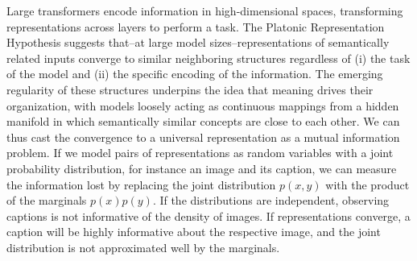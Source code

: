 \documentclass[10pt]{article} %
\begin{document}






Large transformers encode information in high-dimensional spaces,
transforming representations across layers to perform a task. The
Platonic Representation Hypothesis \citep{platonic_hypothesis}
suggests that--at large model sizes--representations of semantically related inputs converge to
similar neighboring structures regardless of (i) the task of the
model and (ii) the specific encoding of the information. The emerging
regularity of these structures underpins the idea that meaning drives
their organization, with models loosely acting as continuous mappings
from a hidden manifold in which semantically similar concepts are close
to each other. We can thus cast the convergence to a universal
representation as a mutual information problem. If we model pairs of representations as random variables with a joint probability distribution, for instance an image and its
caption, we can measure the information lost by replacing the joint
distribution $p(x,y)$ with the product of the marginals $p(x)p(y)$.
If the distributions are independent, observing captions is not
informative of the density of images. If representations converge, a caption will be highly informative about the respective image, and the joint distribution is
not approximated well by the marginals.
\end{document}
